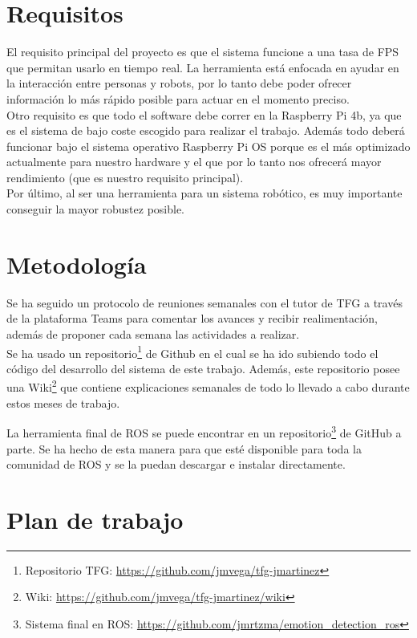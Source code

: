 \section{Requisitos}
\label{sec:requisitos}

El requisito principal del proyecto es que el sistema funcione a una tasa de FPS que permitan usarlo en tiempo real. La herramienta está enfocada en ayudar en la interacción entre personas y robots, por lo tanto debe poder ofrecer información lo más rápido posible para actuar en el momento preciso.\\

Otro requisito es que todo el software debe correr en la Raspberry Pi 4b, ya que es el sistema de bajo coste escogido para realizar el trabajo. Además todo deberá funcionar bajo el sistema operativo Raspberry Pi OS porque es el más optimizado actualmente para nuestro hardware y el que por lo tanto nos ofrecerá mayor rendimiento (que es nuestro requisito principal).\\

Por último, al ser una herramienta para un sistema robótico, es muy importante conseguir la mayor robustez posible.

\section{Metodología}
\label{sec:metodologia}

Se ha seguido un protocolo de reuniones semanales con el tutor de TFG a través de la plataforma Teams para comentar los avances y recibir realimentación, además de proponer cada semana las actividades a realizar.\\

Se ha usado un repositorio\footnote{Repositorio TFG: \url{https://github.com/jmvega/tfg-jmartinez}} de Github en el cual se ha ido subiendo todo el código del desarrollo del sistema de este trabajo. Además, este repositorio posee una Wiki\footnote{Wiki: \url{https://github.com/jmvega/tfg-jmartinez/wiki}} que contiene explicaciones semanales de todo lo llevado a cabo durante estos meses de trabajo.

La herramienta final de ROS se puede encontrar en un repositorio\footnote{Sistema final en ROS: \url{https://github.com/jmrtzma/emotion_detection_ros}} de GitHub a parte. Se ha hecho de esta manera para que esté disponible para toda la comunidad de ROS y se la puedan descargar e instalar directamente.

\section{Plan de trabajo}
\label{sec:plantrabajo}

